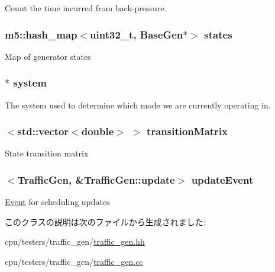 \label{classTrafficGen_a2d1dee1e20aeb0205ae665d7ad08b822}
Count the time incurred from back-\/pressure. \hypertarget{classTrafficGen_a033c23b252da5264e1f864277711e5e1}{
\subsubsection[{states}]{\setlength{\rightskip}{0pt plus 5cm}m5::hash\_\-map$<${\bf uint32\_\-t}, {\bf BaseGen}$\ast$$>$ {\bf states}}}
\label{classTrafficGen_a033c23b252da5264e1f864277711e5e1}
Map of generator states \hypertarget{classTrafficGen_af27ccd765f13a4b7bd119dc7579e2746}{
\subsubsection[{system}]{$\ast$ {\bf system}}}
\label{classTrafficGen_af27ccd765f13a4b7bd119dc7579e2746}
The system used to determine which mode we are currently operating in. \hypertarget{classTrafficGen_a14f30e68ecada24867b46bcc8093f4f5}{
\subsubsection[{transitionMatrix}]{$<${\bf std::vector}$<$double$>$ $>$ {\bf transitionMatrix}}}
\label{classTrafficGen_a14f30e68ecada24867b46bcc8093f4f5}
State transition matrix \hypertarget{classTrafficGen_ab779474477fa217dd5483711dec2bf13}{
\subsubsection[{updateEvent}]{$<${\bf TrafficGen}, \&TrafficGen::update$>$ {\bf updateEvent}}}
\label{classTrafficGen_ab779474477fa217dd5483711dec2bf13}
\hyperlink{classEvent}{Event} for scheduling updates 

このクラスの説明は次のファイルから生成されました:\begin{DoxyCompactItemize}
\item 
cpu/testers/traffic\_\-gen/\hyperlink{traffic__gen_8hh}{traffic\_\-gen.hh}\item 
cpu/testers/traffic\_\-gen/\hyperlink{traffic__gen_8cc}{traffic\_\-gen.cc}\end{DoxyCompactItemize}
